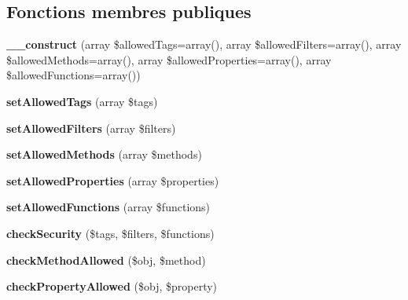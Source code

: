 \subsection*{Fonctions membres publiques}
\begin{DoxyCompactItemize}
\item 
{\bfseries \+\_\+\+\_\+construct} (array \$allowed\+Tags=array(), array \$allowed\+Filters=array(), array \$allowed\+Methods=array(), array \$allowed\+Properties=array(), array \$allowed\+Functions=array())\hypertarget{class_twig___sandbox___security_policy_a288ff1d009a46e1e8660669fc19afd17}{}\label{class_twig___sandbox___security_policy_a288ff1d009a46e1e8660669fc19afd17}

\item 
{\bfseries set\+Allowed\+Tags} (array \$tags)\hypertarget{class_twig___sandbox___security_policy_a4125bc9f2be37e437d0ba7c7247e3f13}{}\label{class_twig___sandbox___security_policy_a4125bc9f2be37e437d0ba7c7247e3f13}

\item 
{\bfseries set\+Allowed\+Filters} (array \$filters)\hypertarget{class_twig___sandbox___security_policy_ae0bdb77fd92459be98bdfefa9f718440}{}\label{class_twig___sandbox___security_policy_ae0bdb77fd92459be98bdfefa9f718440}

\item 
{\bfseries set\+Allowed\+Methods} (array \$methods)\hypertarget{class_twig___sandbox___security_policy_af566c2892a8cee90ee805464f8af9555}{}\label{class_twig___sandbox___security_policy_af566c2892a8cee90ee805464f8af9555}

\item 
{\bfseries set\+Allowed\+Properties} (array \$properties)\hypertarget{class_twig___sandbox___security_policy_adebca74d932998a242294bd7ca96b785}{}\label{class_twig___sandbox___security_policy_adebca74d932998a242294bd7ca96b785}

\item 
{\bfseries set\+Allowed\+Functions} (array \$functions)\hypertarget{class_twig___sandbox___security_policy_a60d0caccd400dac1a01c50edb61d5927}{}\label{class_twig___sandbox___security_policy_a60d0caccd400dac1a01c50edb61d5927}

\item 
{\bfseries check\+Security} (\$tags, \$filters, \$functions)\hypertarget{class_twig___sandbox___security_policy_a0cc084f6abef1e1ba223ddd057ddcd2b}{}\label{class_twig___sandbox___security_policy_a0cc084f6abef1e1ba223ddd057ddcd2b}

\item 
{\bfseries check\+Method\+Allowed} (\$obj, \$method)\hypertarget{class_twig___sandbox___security_policy_a90633d7d23e0b157387b886a8ef87a36}{}\label{class_twig___sandbox___security_policy_a90633d7d23e0b157387b886a8ef87a36}

\item 
{\bfseries check\+Property\+Allowed} (\$obj, \$property)\hypertarget{class_twig___sandbox___security_policy_a182de0b428b216f43d865cbf54ff7c4c}{}\label{class_twig___sandbox___security_policy_a182de0b428b216f43d865cbf54ff7c4c}

\end{DoxyCompactItemize}
